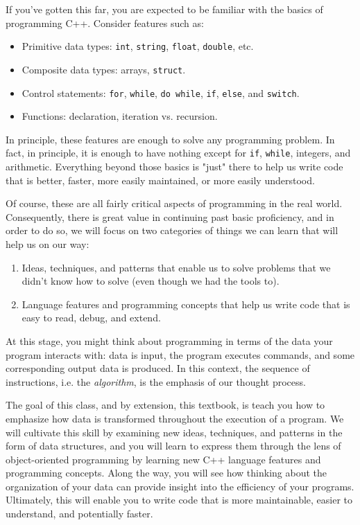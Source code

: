 If you've gotten this far, you are expected to be familiar with the basics of programming C++.
Consider features such as:

\begin{itemize}
\item Primitive data types: \texttt{int}, \texttt{string}, \texttt{float}, \texttt{double}, etc.
\item Composite data types: arrays, \texttt{struct}.
\item Control statements: \texttt{for}, \texttt{while}, \texttt{do while}, \texttt{if}, \texttt{else}, and \texttt{switch}.
\item Functions: declaration, iteration vs. recursion.
\end{itemize}

In principle, these features are enough to solve any programming problem.
In fact, in principle, it is enough to have nothing except for \texttt{if}, \texttt{while}, integers, and arithmetic.
Everything beyond those basics is "just" there to help us write code that is better, faster, more easily maintained, or more easily understood.

Of course, these are all fairly critical aspects of programming in the real world.
Consequently, there is great value in continuing past basic proficiency, and in order to do so, we will focus on two categories of things we can learn that will help us on our way:

\begin{enumerate}
\item Ideas, techniques, and patterns that enable us to solve problems that we didn't know how to solve (even though we had the tools to).
\item Language features and programming concepts that help us write code that is easy to read, debug, and extend.
\end{enumerate}

At this stage, you might think about programming in terms of the data your program interacts with: data is input, the program executes commands, and some corresponding output data is produced.
In this context, the sequence of instructions, i.e. the \emph{algorithm}, is the emphasis of our thought process.

The goal of this class, and by extension, this textbook, is teach you how to emphasize how data is transformed throughout the execution of a program.
We will cultivate this skill by examining new ideas, techniques, and patterns in the form of data structures, and you will learn to express them through the lens of object-oriented programming by learning new C++ language features and programming concepts.
Along the way, you will see how thinking about the organization of your data can provide insight into the efficiency of your programs.
Ultimately, this will enable you to write code that is more maintainable, easier to understand, and potentially faster.

